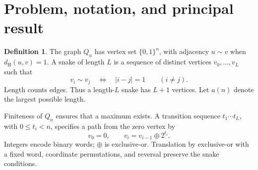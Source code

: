 \documentclass[11pt,a4paper]{article}
\theoremstyle{definition}
\newtheorem{definition}[theorem]{Definition}
\theoremstyle{remark}
\newcommand{\Q}{Q}
\newcommand{\Ham}{d_{\mathrm H}}
\begin{document}
\begin{abstract}
of the fifteen archived 96- through 98-edge parents attain 191. All
five have 96 edges. A complete search also excludes length 192 when
an arm of at least 96 edges retains any 68-edge segment of the 22
reference parents, up to cube isometry and reversal. Repeating this growth
operation reaches exactly 237 long arms in three components. For the saved 98-edge parent the
maximum single-crossing join lies between 179 and 187 inclusive.
Starting from the five attaining parents, repeated changes of at most four
smaller-class sites reach exactly twelve shapes with one-crossing maximum
191. Any 96-edge window in either arm of a one-crossing snake of at least 192 edges
must omit at least five of the 48 smaller-class sites of each of these
twelve references under every cube isometry. For the separate distant
reference, at least four omissions are necessary. Every one of the 41 shapes reached
from that reference by repeated single-site exchanges requires at least
two omissions.

Written proofs, Lean-checked implications and independently audited
numerical evidence are distinguished throughout. No construction above
191 or matching global upper bound is obtained. The numerical conjecture
$a(9)=196$ remains separate from every proved result.
\end{abstract}

\clearpage
\hypersetup{pageanchor=true}
\setcounter{tocdepth}{4}
\tableofcontents
\clearpage
{}

\section{Problem, notation, and principal result}\label{sec:problem}
\begin{definition}
The graph $\Q_n$ has vertex set $\{0,1\}^n$, with adjacency $u\sim v$ when $\Ham(u,v)=1$. A snake of length $L$ is a sequence of distinct vertices $v_0,\ldots,v_L$ such that
\[
v_i\sim v_j\quad\Longleftrightarrow\quad |i-j|=1\qquad(i\ne j).
\]
Length counts edges. Thus a length-$L$ snake has $L+1$ vertices. Let $a(n)$ denote the largest possible length.
\end{definition}
Finiteness of $\Q_n$ ensures that a maximum exists. A transition sequence $t_1\cdots t_L$, with $0\le t_i<n$, specifies a path from the zero vertex by
\[
v_0=0,\qquad v_i=v_{i-1}\mathbin{\oplus}2^{t_i}.
\]
Integers encode binary words; $\oplus$ is exclusive-or. Translation by exclusive-or with a fixed word, coordinate permutations, and reversal preserve the snake conditions.
\end{document}
